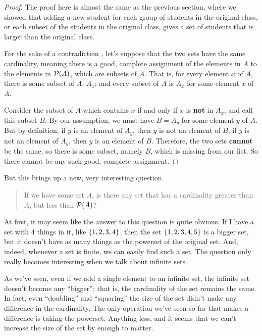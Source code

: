 \begin{proof}
    The proof here is almost the same as the previous section, where we showed that adding a new student for each group of students in the original class, or each subset of the students in the original class, gives a set of students that is larger than the original class.

    For the sake of a contradiction , let's suppose that the two sets have the same cardinality, meaning there is a good, complete assignment of the elements in $A$ to the elements in $\mathcal{P}{\left( {A} \right)}$, which are subsets of $A$.
    That is, for every element $x$ of $A$, there is some subset of $A$, $A_x$; and every subset of $A$ is $A_x$ for some element $x$ of $A$.

    Consider the subset of $A$ which contains $x$ if and only if $x$ is \textbf{not} in $A_x$, and call this subset $B$.
    By our assumption, we must have $B = A_y$ for some element $y$ of $A$.
    But by definition, if $y$ is an element of $A_y$, then $y$ is not an element of $B$; if $y$ is not an element of $A_y$, then $y$ is an element of $B$.
    Therefore, the two sets \textbf{cannot} be the same, so there is some subset, namely $B$, which is missing from our list.
    So there cannot be any such good, complete assignment.
\end{proof}

But this brings up a new, very interesting question.

\begin{quote}
    If we have some set $A$, is there any set that has a cardinality greater than $A$, but less than $\mathcal{P}{\left( {A} \right)}$?
\end{quote}

At first, it may seem like the answer to this question is quite obvious.
If I have a set with $4$ things in it, like ${\left\{ {1,2,3,4} \right\}}$, then the set ${\left\{ {1,2,3,4,5} \right\}}$ is a bigger set, but it doesn't have as many things as the powerset of the original set.
And, indeed, whenever a set is finite, we can easily find such a set.
The question only really becomes interesting when we talk about infinite sets.

As we've seen, even if we add a single element to an infinite set, the infinite set doesn't become any ``bigger''; that is, the cardinality of the set remains the same.
In fact, even ``doubling'' and ``squaring'' the size of the set didn't make any difference in the cardinality.
The only operation we've seen so far that makes a difference is taking the powerset.
Anything less, and it seems that we can't increase the size of the set by enough to matter.

